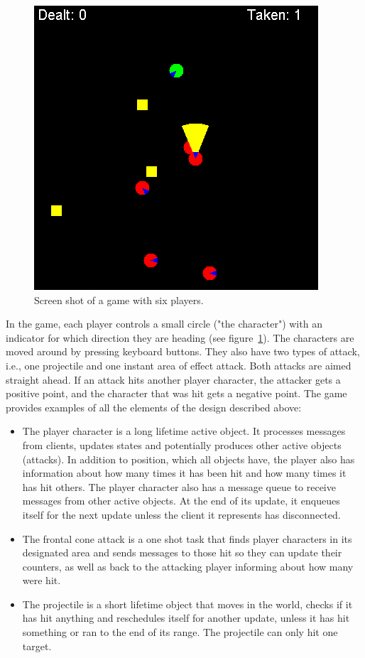 \begin{figure}
  \includegraphics[width=\columnwidth]{FIG/screenshot}
  \caption{Screen shot of a game with six players.}
  \label{fig:screen}
\end{figure}
In the game, each player controls a small circle ("the
character") with an indicator for which direction they are heading
(see figure~\ref{fig:screen}). The
characters are moved around by pressing keyboard buttons. They also
have two types of attack, i.e.,  one projectile and one instant area of effect
attack. Both attacks are aimed straight ahead. If an attack hits
another player character, the attacker gets a positive point, and the
character that was hit gets a negative point. The game
provides examples of all the elements of the design described
above:
\begin{itemize}
\item The player character is a long lifetime active object. It
  processes messages from clients, updates states and potentially
  produces other active objects (attacks). In addition to position,
  which all objects have, the player also has information about how
  many times it has been hit and how many times it has hit others. The
  player character also has a message queue to receive messages from
  other active objects. At the end of its update, it enqueues
  itself for the next update unless the client it represents has
  disconnected.
\item The frontal cone attack is a one shot task that finds player
  characters in its designated area and sends messages to those hit so
  they can update their counters, as well as back to the attacking
  player informing about how many were hit.
\item The projectile is a short lifetime object that moves in the
  world, checks if it has hit anything and reschedules itself for
  another update, unless it has hit something or ran to the end of its
  range. The projectile can only hit one target.
\end{itemize}


